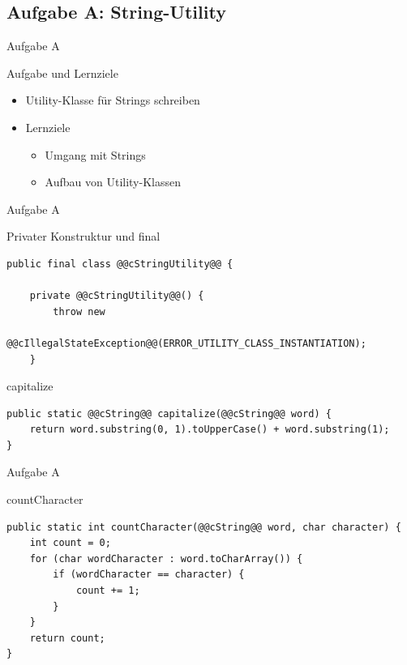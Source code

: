 \documentclass[aspectratio=169]{beamer}
\begin{document}
\subsection{Aufgabe A: String-Utility}
\begin{frame}{Aufgabe A}
  \begin{block}{Aufgabe und Lernziele}
    \begin{itemize}
      \pause
      \item Utility-Klasse für Strings schreiben
      \pause
      \item Lernziele \begin{itemize}
          \pause
          \item Umgang mit Strings
          \pause
          \item Aufbau von Utility-Klassen
        \end{itemize}
    \end{itemize}
  \end{block}
\end{frame}

\begin{frame}[fragile]{Aufgabe A}
  \begin{alertblock}{Privater Konstruktur und final}
    \begin{lstlisting}
public final class @@cStringUtility@@ {

    private @@cStringUtility@@() {
        throw new
            @@cIllegalStateException@@(ERROR_UTILITY_CLASS_INSTANTIATION);
    }
    \end{lstlisting}
  \end{alertblock}
  \pause
  \begin{block}{capitalize}
    \begin{lstlisting}
public static @@cString@@ capitalize(@@cString@@ word) {
    return word.substring(0, 1).toUpperCase() + word.substring(1);
}
    \end{lstlisting}
  \end{block}
\end{frame}

\begin{frame}[fragile]{Aufgabe A}
  \begin{block}{countCharacter}
    \begin{lstlisting}
public static int countCharacter(@@cString@@ word, char character) {
    int count = 0;
    for (char wordCharacter : word.toCharArray()) {
        if (wordCharacter == character) {
            count += 1;
        }
    }
    return count;
}
    \end{lstlisting}
  \end{block}
\end{frame}
\end{document}
